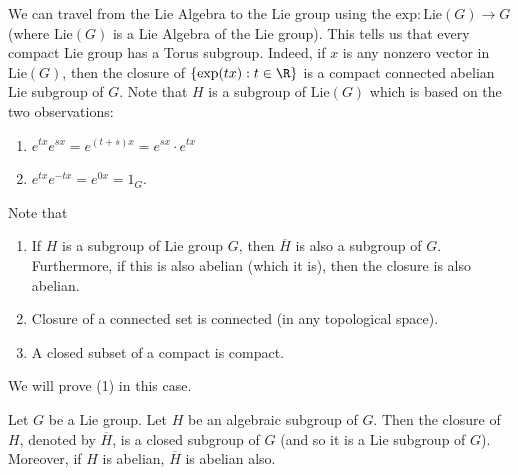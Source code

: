 \begin{remark}
    We can travel from the Lie Algebra to the Lie group using the \( \text{exp}: \text{Lie}(G) \to G  \) (where \( \text{Lie}(G) \) is a Lie Algebra of the Lie group). This tells us that every compact Lie group has a Torus subgroup. Indeed, if \( x  \) is any nonzero vector in \( \text{Lie}(G) \), then the closure of \( \{ \text{exp}(tx) : t \in \R  \}  \) is a compact connected abelian Lie subgroup of \( G  \). Note that \( H  \) is a subgroup of \( \text{Lie}(G)  \) which is based on the two observations:
    \begin{enumerate}
        \item[(1)] \( e^{tx} e^{sx} = e^{(t+s)x} = e^{sx} \cdot e^{tx} \)
        \item[(2)] \( e^{tx} e^{-tx} = e^{0x} = {1}_{G} \).
    \end{enumerate}
    Note that 
    \begin{enumerate}
        \item[(1)] If \( H  \) is a subgroup of Lie group \( G  \), then \( \overline{H} \) is also a subgroup of \( G  \). Furthermore, if this is also abelian (which it is), then the closure is also abelian.
        \item[(2)] Closure of a connected set is connected (in any topological space). 
        \item[(3)] A closed subset of a compact is compact. 
    \end{enumerate} 
    We will prove (1) in this case.
\end{remark}
Let \( G  \) be a Lie group. Let \( H  \) be an algebraic subgroup of \( G  \). Then the closure of \( H \), denoted by \( \overline{H} \), is a closed subgroup of \( G  \) (and so it is a Lie subgroup of \( G  \)). Moreover, if \( H  \) is abelian, \( \overline{H} \) is abelian also.
